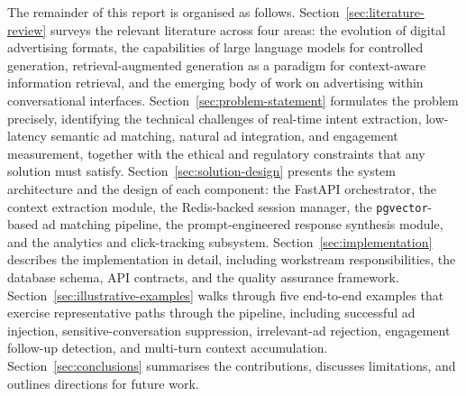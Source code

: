 The remainder of this report is organised as follows.
Section~\ref{sec:literature-review} surveys the relevant literature across four
areas: the evolution of digital advertising formats, the capabilities of large
language models for controlled generation, retrieval-augmented generation as a
paradigm for context-aware information retrieval, and the emerging body of work
on advertising within conversational interfaces. Section~\ref{sec:problem-statement}
formulates the problem precisely, identifying the technical challenges of
real-time intent extraction, low-latency semantic ad matching, natural ad
integration, and engagement measurement, together with the ethical and regulatory
constraints that any solution must satisfy.
Section~\ref{sec:solution-design} presents the system architecture and the
design of each component: the FastAPI orchestrator, the context extraction
module, the Redis-backed session manager, the \texttt{pgvector}-based ad
matching pipeline, the prompt-engineered response synthesis module, and the
analytics and click-tracking subsystem. Section~\ref{sec:implementation}
describes the implementation in detail, including workstream responsibilities,
the database schema, API contracts, and the quality assurance framework.
Section~\ref{sec:illustrative-examples} walks through five end-to-end examples
that exercise representative paths through the pipeline, including successful ad
injection, sensitive-conversation suppression, irrelevant-ad rejection,
engagement follow-up detection, and multi-turn context accumulation.
Section~\ref{sec:conclusions} summarises the contributions, discusses
limitations, and outlines directions for future work.